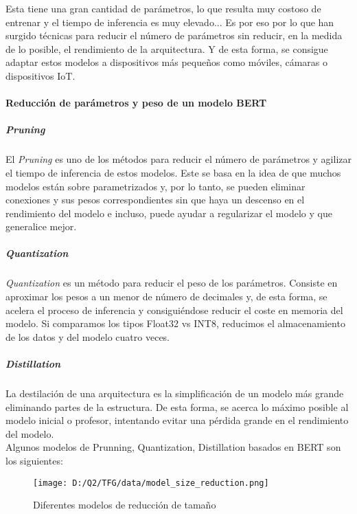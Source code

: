\documentclass[10pt,riqno,a4paper,twoside]{article}\usepackage[]{graphicx}\usepackage[]{color}
\begin{document}
Esta tiene una gran cantidad de parámetros, lo que resulta muy costoso de entrenar y el tiempo de inferencia es muy elevado... Es por eso por lo que han surgido técnicas para reducir el número de parámetros sin reducir, en la medida de lo posible, el rendimiento de la arquitectura. Y de esta forma, se consigue adaptar estos modelos a dispositivos más pequeños como móviles, cámaras o dispositivos IoT. 

\paragraph{Reducción de parámetros y peso de un modelo BERT}

\subparagraph{Pruning\\}

El \textit{Pruning} es uno de los métodos para reducir el número de parámetros y agilizar el tiempo de inferencia de estos modelos. Este se basa en la idea de que muchos modelos están sobre parametrizados y, por lo tanto, se pueden eliminar conexiones y sus pesos correspondientes sin que haya un descenso en el rendimiento del modelo e incluso, puede ayudar a regularizar el modelo y que generalice mejor.

\subparagraph{Quantization\\}

\textit{Quantization} es un método para reducir el peso de los parámetros. Consiste en aproximar los pesos a un menor de número de decimales y, de esta forma, se acelera el proceso de inferencia y consiguiéndose reducir el coste en memoria del modelo. Si comparamos los tipos Float32 vs INT8, reducimos el almacenamiento de los datos y del modelo cuatro veces. 

\subparagraph{Distillation\\}

La destilación de una arquitectura es la simplificación de un modelo más grande eliminando partes de la estructura. De esta forma, se acerca lo máximo posible al modelo inicial o profesor, intentando evitar una pérdida grande en el rendimiento del modelo.\\

Algunos modelos de Prunning, Quantization, Distillation basados en BERT son los siguientes: \cite{arquitecturas}

\begin{figure}[h]
\caption{Diferentes modelos de reducción de tamaño}
\begin{center}
\texttt{[image: D:/Q2/TFG/data/model\_size\_reduction.png]}
\end{center}
\end{figure}
\end{document}
